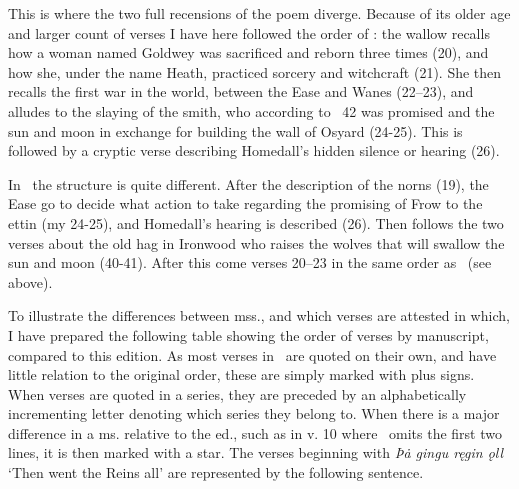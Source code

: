 This is where the two full recensions of the poem diverge. Because of its older age and larger count of verses I have here followed the order of \Regius: the wallow recalls how a woman named Goldwey was sacrificed and reborn three times (20), and how she, under the name Heath, practiced sorcery and witchcraft (21). She then recalls the first war in the world, between the Ease and Wanes (22–23), and alludes to the slaying of the smith, who according to \Gylfaginning\ 42 was promised  and the sun and moon in exchange for building the wall of Osyard (24-25). This is followed by a cryptic verse describing Homedall’s hidden silence or hearing (26).

In \Hauksbok\ the structure is quite different. After the description of the norns (19), the Ease go to decide what action to take regarding the promising of Frow to the ettin (my 24-25), and Homedall’s hearing is described (26). Then follows the two verses about the old hag in Ironwood who raises the wolves that will swallow the sun and moon (40-41). After this come verses 20–23 in the same order as \Regius\ (see above).

To illustrate the differences between mss., and which verses are attested in which, I have prepared the following table showing the order of verses by manuscript, compared to this edition. As most verses in \GylfMS\ are quoted on their own, and have little relation to the original order, these are simply marked with plus signs. When verses are quoted in a series, they are preceded by an alphabetically incrementing letter denoting which series they belong to. When there is a major difference in a ms. relative to the ed., such as in v. 10 where \GylfMS\ omits the first two lines, it is then marked with a star. The verses beginning with \emph{Þȧ gingu ręgin ǫll} ‘Then went the Reins all’ are represented by the following sentence.


